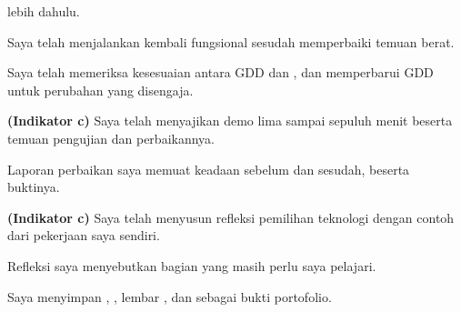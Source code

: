 \begin{checklistbox}
\begin{checklist}
        lebih dahulu.
  \item Saya telah menjalankan kembali  fungsional sesudah
        memperbaiki temuan berat.
  \item Saya telah memeriksa kesesuaian antara GDD dan , dan
        memperbarui GDD untuk perubahan yang disengaja.
  \item {\bfseries (Indikator c)} Saya telah menyajikan demo lima sampai
        sepuluh menit beserta temuan pengujian dan perbaikannya.
  \item Laporan perbaikan saya memuat keadaan sebelum dan sesudah, beserta
        buktinya.
  \item {\bfseries (Indikator c)} Saya telah menyusun refleksi pemilihan
        teknologi dengan contoh dari pekerjaan saya sendiri.
  \item Refleksi saya menyebutkan bagian yang masih perlu saya pelajari.
  \item Saya menyimpan , , lembar
        , dan  sebagai bukti portofolio.
\end{checklist}
\end{checklistbox}
